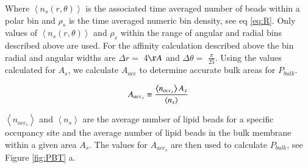 \documentclass[preprint,3p,9pt,times,onecolumn]{elsarticle}
\begin{document}
Where $\left\langle n_s(r,\theta) \right\rangle$ is the associated time averaged number of beads within a polar bin and $\rho_s$ is the time averaged numeric bin density, see eq \ref{eq:R}. Only values of $\left\langle n_s(r,\theta) \right\rangle$ and  $\rho_s$ within the range of angular and radial bins described above are used. For the affinity calculation described above the bin radial and angular widths are $\Delta r=$  4$\AA$ and $\Delta \theta=$ $\frac{\pi}{25}$. Using the values calculated for $A_s$, we calculate $A_{acc}$ to determine accurate bulk areas for $P_{bulk}$.

\begin{equation}
	A_{acc_s} \equiv \frac{\left\langle n_{occ_s} \right\rangle A_s }{\left\langle n_s \right\rangle} \label{eq:aac}\\
\end{equation}

$\left\langle n_{occ_s}\right\rangle$ and $\left\langle n_s  \right\rangle$ are the average number of lipid beads for a specific occupancy site and the average number of lipid beads in the bulk membrane within a given area $A_s$. The values for $A_{acc_s}$ are then used to calculate $P_{bulk}$, see Figure \ref{fig:PBT} a.
\end{document}
